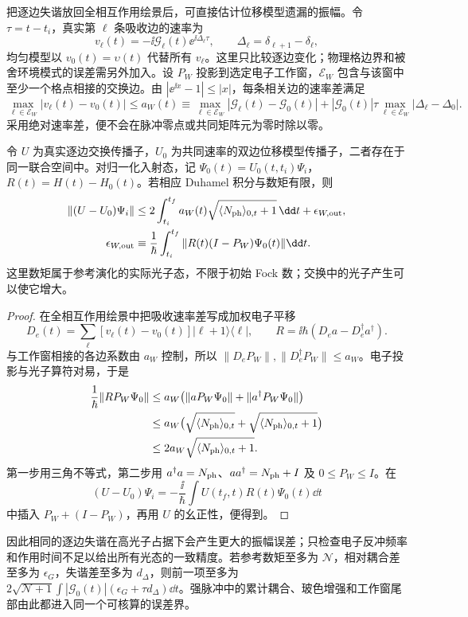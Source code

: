 把逐边失谐放回全相互作用绘景后，可直接估计位移模型遗漏的振幅。令 $\tau=t-t_i$，真实第 $\ell$ 条吸收边的速率为
\[
 v_\ell(t)=-\ii\mathcal G_\ell(t)\ee^{\ii\Delta_\ell\tau},\qquad
 \Delta_\ell=\delta_{\ell+1}-\delta_\ell,
\]
均匀模型以 $v_0(t)=\upsilon(t)$ 代替所有 $v_\ell$。这里只比较逐边变化；物理格边界和被舍环境模式的误差需另外加入。设 $P_W$ 投影到选定电子工作窗，$\mathcal E_W$ 包含与该窗中至少一个格点相接的交换边。由 $|\ee^{\ii x}-1|\le|x|$，每条相关边的速率差满足
\begin{equation}
 \max_{\ell\in\mathcal E_W}|v_\ell(t)-v_0(t)|
 \le a_W(t)\equiv
 \max_{\ell\in\mathcal E_W}|\mathcal G_\ell(t)-\mathcal G_0(t)|
 +|\mathcal G_0(t)|\tau
  \max_{\ell\in\mathcal E_W}|\Delta_\ell-\Delta_0|.
 \label{eq:feqo-quantum-edge-rate-error}
\end{equation}
采用绝对速率差，便不会在脉冲零点或共同矩阵元为零时除以零。

\begin{proposition}[逐边变化与玻色数矩的传播误差]
令 $U$ 为真实逐边交换传播子，$U_0$ 为共同速率的双边位移模型传播子，二者存在于同一联合空间中。对归一化入射态，记 $\Psi_0(t)=U_0(t,t_i)\Psi_i$，$R(t)=H(t)-H_0(t)$。若相应 Duhamel 积分与数矩有限，则
\begin{equation}
\begin{aligned}
 \|(U-U_0)\Psi_i\|
 &\le2\int_{t_i}^{t_f}a_W(t)
       \sqrt{\langle N_{\rm ph}\rangle_{0,t}+1}\,\dd t
       +\epsilon_{W,\rm out},\\
 \epsilon_{W,\rm out}
 &\equiv\frac1\hbar\int_{t_i}^{t_f}
       \|R(t)(I-P_W)\Psi_0(t)\|\dd t.
\end{aligned}
\label{eq:feqo-quantum-ladder-propagation-error}
\end{equation}
这里数矩属于参考演化的实际光子态，不限于初始 Fock 数；交换中的光子产生可以使它增大。
\end{proposition}
\begin{proof}
在全相互作用绘景中把吸收速率差写成加权电子平移
\[
 D_e(t)=\sum_\ell[v_\ell(t)-v_0(t)]
                 |\ell+1\rangle\langle\ell|,
 \qquad R=\ii\hbar(D_ea-D_e^\dagger a^\dagger).
\]
与工作窗相接的各边系数由 $a_W$ 控制，所以
$\|D_eP_W\|,\|D_e^\dagger P_W\|\le a_W$。电子投影与光子算符对易，于是
\begin{align*}
 \frac1\hbar\|RP_W\Psi_0\|
 &\le a_W\bigl(\|aP_W\Psi_0\|
                         +\|a^\dagger P_W\Psi_0\|\bigr)\\
 &\le a_W\bigl(\sqrt{\langle N_{\rm ph}\rangle_{0,t}}
                   +\sqrt{\langle N_{\rm ph}\rangle_{0,t}+1}\bigr)\\
 &\le2a_W\sqrt{\langle N_{\rm ph}\rangle_{0,t}+1}.
\end{align*}
第一步用三角不等式，第二步用 $a^\dagger a=N_{\rm ph}$、$aa^\dagger=N_{\rm ph}+I$ 及 $0\le P_W\le I$。在
\[
 (U-U_0)\Psi_i=-\frac\ii\hbar\int U(t_f,t)R(t)\Psi_0(t)\dd t
\]
中插入 $P_W+(I-P_W)$，再用 $U$ 的幺正性，便得到。
\end{proof}

因此相同的逐边失谐在高光子占据下会产生更大的振幅误差；只检查电子反冲频率和作用时间不足以给出所有光态的一致精度。若参考数矩至多为 $\mathcal N$，相对耦合差至多为 $\epsilon_G$，失谐差至多为 $d_\Delta$，则前一项至多为 $2\sqrt{\mathcal N+1}\int|\mathcal G_0(t)|(\epsilon_G+\tau d_\Delta)\dd t$。强脉冲中的累计耦合、玻色增强和工作窗尾部由此都进入同一个可核算的误差界。
